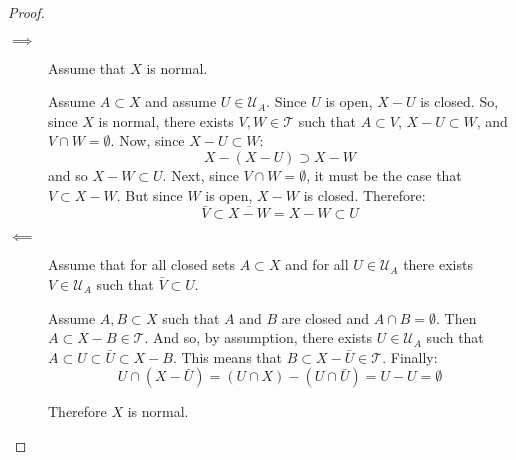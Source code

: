 \documentclass[letterpaper,12pt,fleqn]{article}
\newcommand{\T}{\mathscr{T}}
\newcommand{\U}{\mathcal{U}}
\begin{document}
\begin{proof}
  \begin{description}
  \item[]
  \item[\(\implies\)] Assume that \(X\) is normal.

    Assume \(A\subset X\) and assume \(U\in\U_A\).  Since \(U\) is open, \(X-U\) is closed.  So, since \(X\) is
    normal, there exists \(V,W\in\T\) such that \(A\subset V\), \(X-U\subset W\), and \(V\cap W=\emptyset\).
    Now, since \(X-U\subset W\):
    \[X-(X-U)\supset X-W\]
    and so \(X-W\subset U\).  Next, since \(V\cap W=\emptyset\), it must be the case that \(V\subset X-W\).  But
    since \(W\) is open, \(X-W\) is closed.  Therefore:
    \[\bar{V}\subset\overline{X-W}=X-W\subset U\]

  \item[\(\impliedby\)] Assume that for all closed sets \(A\subset X\) and for all \(U\in\U_A\)
    there exists \(V\in\U_A\) such that \(\bar{V}\subset U\).

    Assume \(A,B\subset X\) such that \(A\) and \(B\) are closed and \(A\cap B=\emptyset\).
    Then \(A\subset X-B\in\T\).  And so, by assumption, there exists \(U\in\U_A\) such that
    \(A\subset U\subset\bar{U}\subset X-B\).  This means that \(B\subset X-\bar{U}\in\T\).  Finally:
    \[U\cap(X-\bar{U})=(U\cap X)-(U\cap\bar{U})=U-U=\emptyset\]

    Therefore \(X\) is normal.
  \end{description}
\end{proof}
\end{document}
